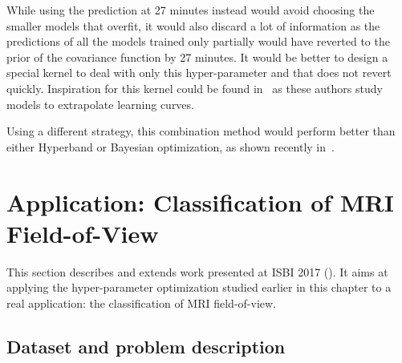 While using the prediction at 27 minutes instead would avoid choosing the smaller models that overfit, it would also discard a lot of information as the predictions of all the models trained only partially would have reverted to the prior of the covariance function by 27 minutes. It would be better to design a special kernel to deal with only this hyper-parameter and that does not revert quickly. Inspiration for this kernel could be found in~\textcite{domhan2015} as these authors study models to extrapolate learning curves.

Using a different strategy, this combination method would perform better than either Hyperband or Bayesian optimization, as shown recently in~\textcite{falkner2018}.

\section{Application: Classification of MRI Field-of-View}
\label{sec:isbi}

This section describes and extends work presented at ISBI 2017 (\textcite{bertrand2017ISBI}). It aims at applying the hyper-parameter optimization studied earlier in this chapter to a real application: the classification of MRI field-of-view.

\subsection{Dataset and problem description}

